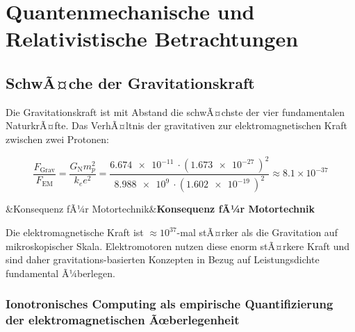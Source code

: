 ﻿\documentclass[12pt, a4paper]{report}
\newenvironment{hinweis}[1][]{%
  \begin{hinweisframe}\sloppy%
  \ifx&#1&\else\textbf{#1}\par\smallskip\fi}{\end{hinweisframe}}
\theoremstyle{definition}
\theoremstyle{remark}
\newcommand{\G}{G_{\text{N}}}          %
\begin{document}
\chapter{Quantenmechanische und Relativistische Betrachtungen}
\label{sec:quanten}

\section{SchwÃ¤che der Gravitationskraft}

Die Gravitationskraft ist mit Abstand die schwÃ¤chste der vier fundamentalen
NaturkrÃ¤fte. Das VerhÃ¤ltnis der gravitativen zur elektromagnetischen Kraft
zwischen zwei Protonen:

\begin{equation}
  \frac{F_{\text{Grav}}}{F_{\text{EM}}}
  = \frac{\G m_p^2}{k_e e^2}
  = \frac{\SI{6.674e-11}{} \cdot (\SI{1.673e-27}{})^2}{\SI{8.988e9}{} \cdot (\SI{1.602e-19}{})^2}
  \approx 8.1 \times 10^{-37}
  \label{eq:kraft_verhaeltnis}
\end{equation}

\begin{hinweis}[Konsequenz fÃ¼r Motortechnik]
  Die elektromagnetische Kraft ist $\approx 10^{37}$-mal stÃ¤rker als die
  Gravitation auf mikroskopischer Skala. Elektromotoren nutzen diese enorm
  stÃ¤rkere Kraft und sind daher gravitations-basierten Konzepten in Bezug
  auf Leistungsdichte fundamental Ã¼berlegen.
\end{hinweis}

\subsection[Ionotronisches Computing als empirische Quantifizierung]{Ionotronisches Computing als empirische Quantifizierung\\[2pt]
            der elektromagnetischen Ãœberlegenheit}
\label{ssec:iofet_em_ueberlegenheit}
\end{document}

